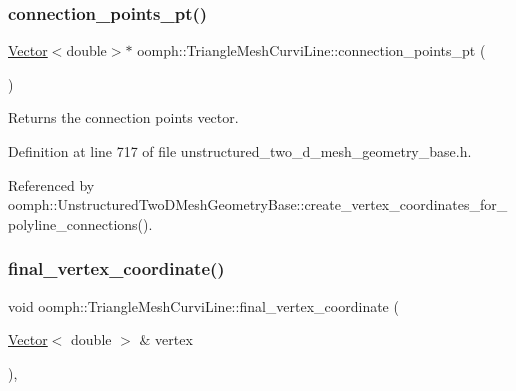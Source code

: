 \mbox{\label{classoomph_1_1TriangleMeshCurviLine_aae5de91e63c33bf883a12bde571e1364}} 
\subsubsection{\texorpdfstring{connection\+\_\+points\+\_\+pt()}{connection\_points\_pt()}}
{\footnotesize\ttfamily \hyperlink{classoomph_1_1Vector}{Vector}$<$double$>$$\ast$ oomph\+::\+Triangle\+Mesh\+Curvi\+Line\+::connection\+\_\+points\+\_\+pt (\begin{DoxyParamCaption}{ }\end{DoxyParamCaption})\hspace{0.3cm}{\ttfamily [inline]}}



Returns the connection points vector. 



Definition at line 717 of file unstructured\+\_\+two\+\_\+d\+\_\+mesh\+\_\+geometry\+\_\+base.\+h.



Referenced by oomph\+::\+Unstructured\+Two\+D\+Mesh\+Geometry\+Base\+::create\+\_\+vertex\+\_\+coordinates\+\_\+for\+\_\+polyline\+\_\+connections().

\mbox{\label{classoomph_1_1TriangleMeshCurviLine_a6a2437a4fb8c17ccc02a82311d477ca0}} 
\subsubsection{\texorpdfstring{final\+\_\+vertex\+\_\+coordinate()}{final\_vertex\_coordinate()}}
{\footnotesize\ttfamily void oomph\+::\+Triangle\+Mesh\+Curvi\+Line\+::final\+\_\+vertex\+\_\+coordinate (\begin{DoxyParamCaption}\item[{\hyperlink{classoomph_1_1Vector}{Vector}$<$ double $>$ \&}]{vertex }\end{DoxyParamCaption})\hspace{0.3cm}{\ttfamily [inline]}, {\ttfamily [virtual]}}



